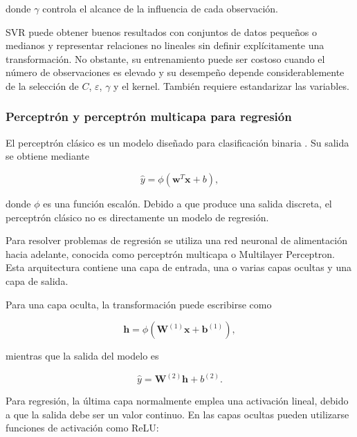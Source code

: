 donde $\gamma$ controla el alcance de la influencia de cada observación.

SVR puede obtener buenos resultados con conjuntos de datos pequeños o medianos y representar relaciones no lineales sin definir explícitamente una transformación. No obstante, su entrenamiento puede ser costoso cuando el número de observaciones es elevado y su desempeño depende considerablemente de la selección de $C$, $\varepsilon$, $\gamma$ y el kernel. También requiere estandarizar las variables.

\subsubsection{Perceptrón y perceptrón multicapa para regresión}
\label{sec:perceptron}

El perceptrón clásico es un modelo diseñado para clasificación binaria \cite{rosenblatt1958perceptron}. Su salida se obtiene mediante

\begin{equation}
    \hat{y}
    =
    \phi
    \left(
        \mathbf{w}^{T}\mathbf{x}+b
    \right),
\end{equation}

donde $\phi$ es una función escalón. Debido a que produce una salida discreta, el perceptrón clásico no es directamente un modelo de regresión.

Para resolver problemas de regresión se utiliza una red neuronal de alimentación hacia adelante, conocida como perceptrón multicapa o Multilayer Perceptron. Esta arquitectura contiene una capa de entrada, una o varias capas ocultas y una capa de salida.

Para una capa oculta, la transformación puede escribirse como

\begin{equation}
    \mathbf{h}
    =
    \phi
    \left(
        \mathbf{W}^{(1)}\mathbf{x}
        +
        \mathbf{b}^{(1)}
    \right),
\end{equation}

mientras que la salida del modelo es

\begin{equation}
    \hat{y}
    =
    \mathbf{W}^{(2)}\mathbf{h}
    +
    b^{(2)}.
\end{equation}

Para regresión, la última capa normalmente emplea una activación lineal, debido a que la salida debe ser un valor continuo. En las capas ocultas pueden utilizarse funciones de activación como ReLU:


